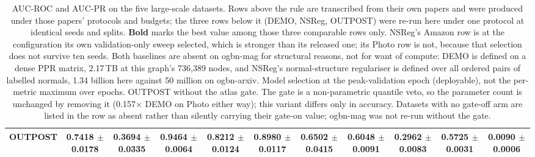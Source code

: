 \begin{table}[t]
\begin{tabular}{lcccccccccc}
\midrule
\textbf{OUTPOST} & \textbf{0.7418 $\pm$ 0.0178} & \textbf{0.3694 $\pm$ 0.0335} & 0.9464 $\pm$ 0.0064 & 0.8212 $\pm$ 0.0124 & 0.8980 $\pm$ 0.0117 & 0.6502 $\pm$ 0.0415 & 0.6048 $\pm$ 0.0091 & 0.2962 $\pm$ 0.0083 & \textbf{0.5725 $\pm$ 0.0031} & \textbf{0.0090 $\pm$ 0.0006} \\
\bottomrule
\end{tabular}
\caption{AUC-ROC and AUC-PR on the five large-scale datasets. Rows above the rule are transcribed from their own papers and were produced under those papers' protocols and budgets; the three rows below it (DEMO, NSReg, OUTPOST) were re-run here under one protocol at identical seeds and splits. \textbf{Bold} marks the best value among those three comparable rows only. NSReg's Amazon row is at the configuration its own validation-only sweep selected, which is stronger than its released one; its Photo row is not, because that selection does not survive ten seeds. Both baselines are absent on ogbn-mag for structural reasons, not for want of compute: DEMO is defined on a dense PPR matrix, 2.17\,TB at this graph's 736{,}389 nodes, and NSReg's normal-structure regulariser is defined over all ordered pairs of labelled normals, 1.34 billion here against 50 million on ogbn-arxiv. Model selection at the peak-validation epoch (deployable), not the per-metric maximum over epochs. OUTPOST without the atlas gate. The gate is a non-parametric quantile veto, so the parameter count is unchanged by removing it (0.157$\times$ DEMO on Photo either way); this variant differs only in accuracy. Datasets with no gate-off arm are listed in the row as absent rather than silently carrying their gate-on value; ogbn-mag was not re-run without the gate.}
\label{tab:table2_large_valsel_gateoff}
\end{table}